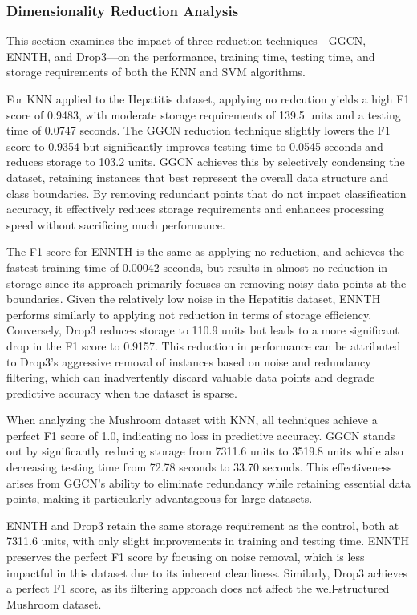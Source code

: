 \subsubsection{Dimensionality Reduction Analysis}
\label{subsubsec:discussion-reduction}

This section examines the impact of three reduction techniques—GGCN, ENNTH, and Drop3—on the performance, training time, testing time, and storage requirements of both the KNN and SVM algorithms.

For KNN applied to the Hepatitis dataset, applying no redcution yields a high F1 score of 0.9483, with moderate storage requirements of 139.5 units and a testing time of 0.0747 seconds. 
The GGCN reduction technique slightly lowers the F1 score to 0.9354 but significantly improves testing time to 0.0545 seconds and reduces storage to 103.2 units. 
GGCN achieves this by selectively condensing the dataset, retaining instances that best represent the overall data structure and class boundaries. 
By removing redundant points that do not impact classification accuracy, it effectively reduces storage requirements and enhances processing speed without sacrificing much performance.

The F1 score for ENNTH is the same as applying no reduction, and achieves the fastest training time of 0.00042 seconds, but results in almost no reduction in storage since its approach primarily focuses on removing noisy data points at the boundaries. 
Given the relatively low noise in the Hepatitis dataset, ENNTH performs similarly to applying not reduction in terms of storage efficiency. 
Conversely, Drop3 reduces storage to 110.9 units but leads to a more significant drop in the F1 score to 0.9157. 
This reduction in performance can be attributed to Drop3's aggressive removal of instances based on noise and redundancy filtering, which can inadvertently discard valuable data points and degrade predictive accuracy when the dataset is sparse.

When analyzing the Mushroom dataset with KNN, all techniques achieve a perfect F1 score of 1.0, indicating no loss in predictive accuracy. 
GGCN stands out by significantly reducing storage from 7311.6 units to 3519.8 units while also decreasing testing time from 72.78 seconds to 33.70 seconds. 
This effectiveness arises from GGCN’s ability to eliminate redundancy while retaining essential data points, making it particularly advantageous for large datasets. 

ENNTH and Drop3 retain the same storage requirement as the control, both at 7311.6 units, with only slight improvements in training and testing time. 
ENNTH preserves the perfect F1 score by focusing on noise removal, which is less impactful in this dataset due to its inherent cleanliness. 
Similarly, Drop3 achieves a perfect F1 score, as its filtering approach does not affect the well-structured Mushroom dataset.

